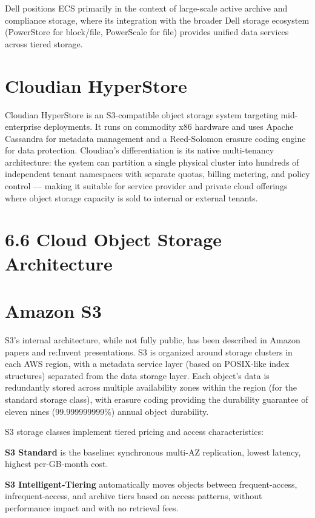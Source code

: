 Dell positions ECS primarily in the context of large-scale active archive and compliance storage, where its integration with the broader Dell storage ecosystem (PowerStore for block/file, PowerScale for file) provides unified data services across tiered storage.

\section{Cloudian HyperStore}
Cloudian HyperStore is an S3-compatible object storage system targeting mid-enterprise deployments. It runs on commodity x86 hardware and uses Apache Cassandra for metadata management and a Reed-Solomon erasure coding engine for data protection. Cloudian's differentiation is its native multi-tenancy architecture: the system can partition a single physical cluster into hundreds of independent tenant namespaces with separate quotas, billing metering, and policy control --- making it suitable for service provider and private cloud offerings where object storage capacity is sold to internal or external tenants.

\section{6.6 Cloud Object Storage Architecture}
\section{Amazon S3}
S3's internal architecture, while not fully public, has been described in Amazon papers and re:Invent presentations. S3 is organized around storage clusters in each AWS region, with a metadata service layer (based on POSIX-like index structures) separated from the data storage layer. Each object's data is redundantly stored across multiple availability zones within the region (for the standard storage class), with erasure coding providing the durability guarantee of eleven nines (99.999999999\%) annual object durability.

S3 storage classes implement tiered pricing and access characteristics:

\textbf{S3 Standard} is the baseline: synchronous multi-AZ replication, lowest latency, highest per-GB-month cost.

\textbf{S3 Intelligent-Tiering} automatically moves objects between frequent-access, infrequent-access, and archive tiers based on access patterns, without performance impact and with no retrieval fees.


